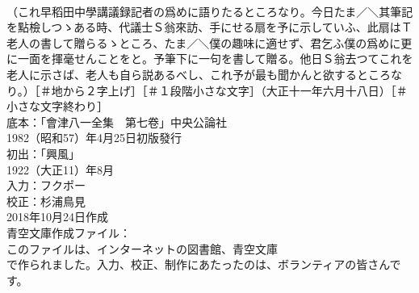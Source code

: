 \documentclass[8pt]{extreport}
\begin{document}
\begin{CJK}{UTF8}{min}
\\	（これ早稻田中學講議録記者の爲めに語りたるところなり。今日たま／＼其筆記を點檢しつゝある時、代議士Ｓ翁來訪、手にせる扇を予に示していふ、此扇はＴ老人の書して贈らるゝところ、たま／＼僕の趣味に適せず、君乞ふ僕の爲めに更に一面を揮毫せんことをと。予筆下に一句を書して贈る。他日Ｓ翁去つてこれを老人に示さば、老人も自ら説あるべし、これ予が最も聞かんと欲するところなり。）［＃地から２字上げ］［＃１段階小さな文字］（大正十一年六月十八日）［＃小さな文字終わり］
\\	底本：「會津八一全集　第七卷」中央公論社
\\	1982（昭和57）年4月25日初版發行
\\	初出：「興風」
\\	1922（大正11）年8月
\\	入力：フクポー
\\	校正：杉浦鳥見
\\	2018年10月24日作成
\\	青空文庫作成ファイル：
\\	このファイルは、インターネットの図書館、青空文庫
\\	で作られました。入力、校正、制作にあたったのは、ボランティアの皆さんです。
\end{CJK}
\end{document}
